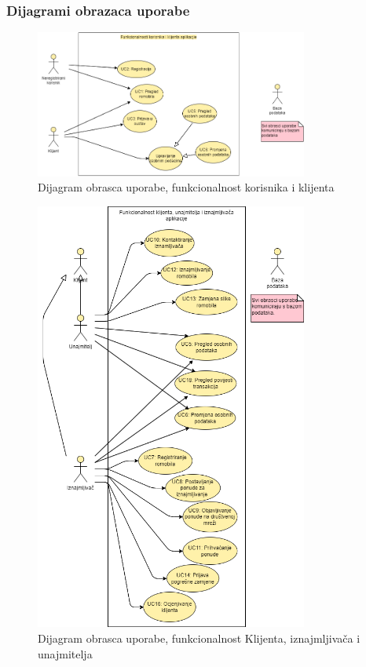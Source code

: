 				\subsubsection{Dijagrami obrazaca uporabe}
				
				
					\begin{figure}[H]
						\centering
						\includegraphics[width=0.8\textwidth]{dijagrami/Funkcionalnost_klijent_korisnik.png}
						\caption{Dijagram obrasca uporabe, funkcionalnost korisnika i klijenta}
						\label{fig:your_label}
					\end{figure}
					
					\begin{figure}[H]
						\centering
						\includegraphics[width=0.8\textwidth]{dijagrami/IznajmljivacUnajmitelj.png}
						\caption{Dijagram obrasca uporabe, funkcionalnost Klijenta, iznajmljivača i unajmitelja}
						\label{fig:your_label}
					\end{figure}
					
